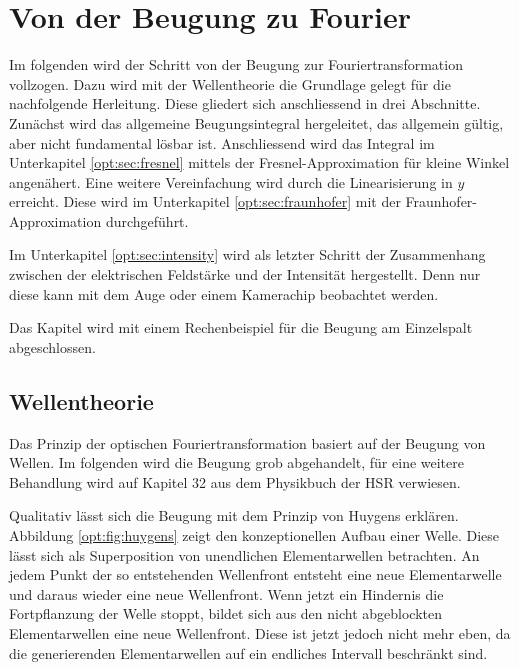 %
%
%
%
\section{Von der Beugung zu Fourier\label{opt:section:grundlagen}}

Im folgenden wird der Schritt von der Beugung zur Fouriertransformation vollzogen.
Dazu wird mit der Wellentheorie die Grundlage gelegt für die nachfolgende Herleitung.
Diese gliedert sich anschliessend in drei Abschnitte. 
Zunächst wird das allgemeine Beugungsintegral hergeleitet, das allgemein gültig, aber nicht fundamental lösbar ist.
Anschliessend wird das Integral im Unterkapitel \ref{opt:sec:fresnel} mittels der Fresnel-Approximation für kleine Winkel angenähert.
Eine weitere Vereinfachung wird durch die Linearisierung in $y$ erreicht. 
Diese wird im Unterkapitel \ref{opt:sec:fraunhofer} mit der Fraunhofer-Approximation durchgeführt.

Im Unterkapitel \ref{opt:sec:intensity} wird als letzter Schritt der Zusammenhang zwischen der elektrischen Feldstärke und der Intensität hergestellt.
Denn nur diese kann mit dem Auge oder einem Kamerachip beobachtet werden.

Das Kapitel wird mit einem Rechenbeispiel für die Beugung am Einzelspalt abgeschlossen. 

\subsection{Wellentheorie}
\label{opt:subsection:huygens}
Das Prinzip der optischen Fouriertransformation basiert auf der Beugung von Wellen.
Im folgenden wird die Beugung grob abgehandelt, für eine weitere Behandlung wird auf Kapitel 32 aus dem Physikbuch der HSR \cite{opt:HSR:Physik2} verwiesen.

Qualitativ lässt sich die Beugung mit dem Prinzip von Huygens erklären. 
Abbildung \ref{opt:fig:huygens} zeigt den konzeptionellen Aufbau einer Welle.
Diese lässt sich als Superposition von unendlichen Elementarwellen betrachten.
An jedem Punkt der so entstehenden Wellenfront entsteht eine neue Elementarwelle und daraus wieder eine neue Wellenfront.
Wenn jetzt ein Hindernis die Fortpflanzung der Welle stoppt, bildet sich aus den nicht abgeblockten Elementarwellen eine neue Wellenfront.
Diese ist jetzt jedoch nicht mehr eben, da die generierenden Elementarwellen auf ein endliches Intervall beschränkt sind.


